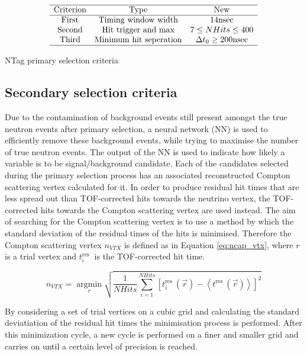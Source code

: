 \begin{table}
    $$
    \begin{array}{ccc}
    \hline \text{Criterion} & \text{Type} & \text{New} \\
    \hline \text { First } & \text{Timing window width} & 14 \mathrm{nsec} \\
    \text { Second } & \text{Hit trigger and max} & 7 \leq NH i t s \leq 400 \\
    \text { Third } & \text{Minimum hit seperation} & \Delta t_0 \geq 200 \mathrm{nsec}\\
    \hline
    \end{array}
    $$
    \caption{NTag primary selection criteria}
    \label{table:new_selection_criteria}
\end{table}



\subsection{Secondary selection criteria}
Due to the contamination of background events still present amongst the true neutron events after primary selection, a neural network (NN) is used to efficiently remove these background events, while trying to maximise the number of true neutron events. The output of the NN is used to indicate how likely a variable is to be signal/background candidate. Each of the candidates selected during the primary selection process has an associated reconstructed Compton scattering vertex calculated for it. In order to produce residual hit times that are less spread out than TOF-corrected hits towards the neutrino vertex, the TOF-corrected hits towards the Compton scattering vertex are used instead. The aim of searching for the Compton scattering vertex is to use a method by which the standard deviation of the residual times of the hits is minimised. Therefore the Compton scattering vertex $n_{VTX}$ is defined as in Equation \ref{eq:ncap_vtx}, where $r$ is a trial vertex and $t_i^{\text {res }}$ is the TOF-corrected hit time.

\begin{equation}
    n_{VTX}=\underset{r}{\operatorname{argmin}}\sqrt{\frac{1}{NHits} \sum_{i=1}^{NHits}\left[t_i^{\text {res }}(\vec{r})-\left\langle t^{\text {res }}(\vec{r})\right\rangle\right]^2}
\label{eq:ncap_vtx}
\end{equation}

 

By considering a set of trial vertices on a cubic grid and calculating the standard deviatiation of the residual hit times the minimisation process is performed. After this minimization cycle, a new cycle is performed on a finer and smaller grid and carries on until a certain level of precision is reached. 

